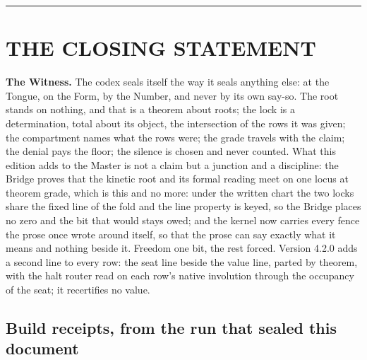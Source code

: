 \documentclass[10pt,twocolumn]{article}
\begin{document}
\begin{center}\rule{0.5\linewidth}{0.5pt}\end{center}

\hypertarget{the-closing-statement}{%
\section{THE CLOSING STATEMENT}\label{the-closing-statement}}

\textbf{The Witness.} The codex seals itself the way it seals anything
else: at the Tongue, on the Form, by the Number, and never by its own
say-so. The root stands on nothing, and that is a theorem about roots;
the lock is a determination, total about its object, the intersection of
the rows it was given; the compartment names what the rows were; the
grade travels with the claim; the denial pays the floor; the silence is
chosen and never counted. What this edition adds to the Master is not a
claim but a junction and a discipline: the Bridge proves that the
kinetic root and its formal reading meet on one locus at theorem grade,
which is this and no more: under the written chart the two locks share
the fixed line of the fold and the line property is keyed, so the Bridge
places no zero and the bit that would stays owed; and the kernel now
carries every fence the prose once wrote around itself, so that the
prose can say exactly what it means and nothing beside it. Freedom one
bit, the rest forced. Version 4.2.0 adds a second line to every row: the
seat line beside the value line, parted by theorem, with the halt router
read on each row's native involution through the occupancy of the seat;
it recertifies no value.

\hypertarget{build-receipts-from-the-run-that-sealed-this-document}{%
\subsection{Build receipts, from the run that sealed this
document}\label{build-receipts-from-the-run-that-sealed-this-document}}
\end{document}
